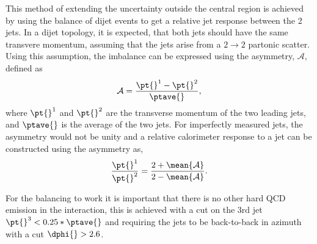 This method of extending the uncertainty outside the central region is achieved by using the \pt{} balance of dijet events to get a relative jet response between the 2 jets.
In a dijet topology, it is expected, that both jets should have the same transvere momentum, assuming that the jets arise from a $2\rightarrow2$ partonic scatter.
Using this assumption, the \pt{} imbalance can be expressed using the asymmetry, $\mathcal{A}$, defined as
\begin{equation}
\mathcal{A} =\frac{\pt{}^1 - \pt{}^2}{\ptave{}},
\label{JetPerf:Assym}
\end{equation}
where $\pt{}^1$ and $\pt{}^2$ are the transverse momentum of the two leading jets, and $\ptave{}$ is the average \pt{} of the two jets.
For imperfectly measured jets, the asymmetry would not be unity and a relative calorimeter response to a jet can be constructed using the asymmetry as,
\begin{equation}
 \frac{\pt{}^1}{\pt{}^2}=\frac{2+\mean{\mathcal{A}}}{2-\mean{\mathcal{A}}}.
\label{JetPerf:JetResp}
\end{equation}


For the balancing to work it is important that there is no other hard QCD emission in the interaction, this is achieved with a cut on the 3rd jet $\pt{}^3<0.25*\ptave{}$ and requiring the jets to be back-to-back in azimuth with a cut $\dphi{}>2.6$.

 
